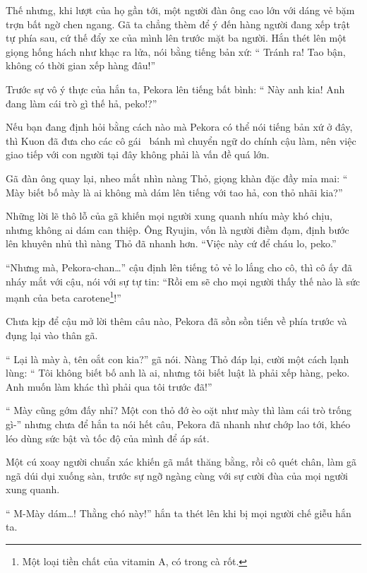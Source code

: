 \documentclass[../main.tex]{subfiles}
\begin{document}
Thế nhưng, khi lượt của họ gần tới, một người đàn ông cao lớn với dáng vẻ bặm trợn bất ngờ chen ngang. Gã ta chẳng thèm để ý đến hàng người đang xếp trật tự phía sau, cứ thế đẩy xe của mình lên trước mặt ba người. Hắn thét lên một giọng hống hách như khạc ra lửa, nói bằng tiếng bản xứ: ``{\color{red} Tránh ra! Tao bận, không có thời gian xếp hàng đâu!}''

Trước sự vô ý thực của hắn ta, Pekora lên tiếng bất bình: ``{\color{red} Này anh kia! Anh đang làm cái trò gì thế hả, peko!?}''

Nếu bạn đang định hỏi bằng cách nào mà Pekora có thể nói tiếng bản xứ ở đây, thì Kuon đã đưa cho các cô gái \hll\ bánh mì chuyển ngữ do chính cậu làm, nên việc giao tiếp với con người tại đây không phải là vấn đề quá lớn.

Gã đàn ông quay lại, nheo mắt nhìn nàng Thỏ, giọng khàn đặc đầy mỉa mai: ``{\color{red} Mày biết bố mày là ai không mà dám lên tiếng với tao hả, con thỏ nhãi kia?}''

Những lời lẽ thô lỗ của gã khiến mọi người xung quanh nhíu mày khó chịu, nhưng không ai dám can thiệp. Ông Ryujin, vốn là người điềm đạm, định bước lên khuyên nhủ thì nàng Thỏ đã nhanh hơn. ``Việc này cứ để cháu lo, peko.''

``Nhưng mà, Pekora-chan\dots'' cậu định lên tiếng tỏ vẻ lo lắng cho cô, thì cô ấy đã nháy mắt với cậu, nói với sự tự tin: ``Rồi em sẽ cho mọi người thấy thế nào là sức mạnh của beta carotene\footnote{Một loại tiền chất của vitamin A, có trong cà rốt.}!''

Chưa kịp để cậu mở lời thêm câu nào, Pekora đã sồn sồn tiến về phía trước và đụng lại vào thân gã.

``{\color{red} Lại là mày à, tên oắt con kia?}'' gã nói. Nàng Thỏ đáp lại, cười một cách lạnh lùng: ``{\color{red} Tôi không biết bố anh là ai, nhưng tôi biết luật là phải xếp hàng, peko. Anh muốn làm khác thì phải qua tôi trước đã!}''

``{\color{red} Mày cũng gớm đấy nhỉ? Một con thỏ đớ èo oặt như mày thì làm cái trò trống gì-}'' nhưng chưa để hắn ta nói hết câu, Pekora đã nhanh như chớp lao tới, khéo léo dùng sức bật và tốc độ của mình để áp sát.

Một cú xoay người chuẩn xác khiến gã mất thăng bằng, rồi cô quét chân, làm gã ngã dúi dụi xuống sàn, trước sự ngỡ ngàng cùng với sự cười đùa của mọi người xung quanh.

``{\color{red} M-Mày dám\dots! Thằng chó này!}'' hắn ta thét lên khi bị mọi người chế giễu hắn ta.
\end{document}

